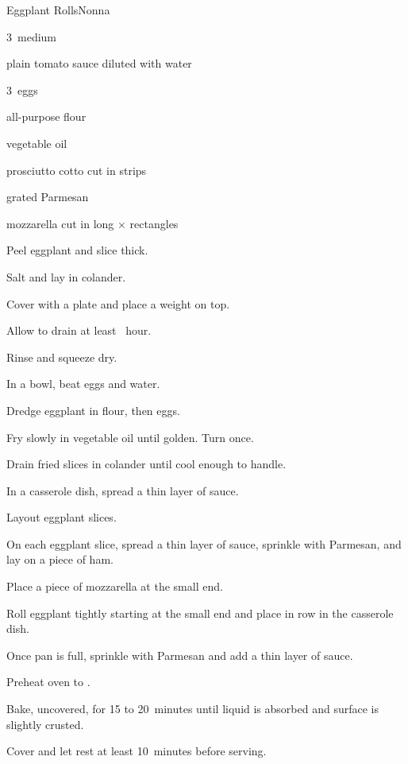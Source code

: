 \begin{recipe}{Eggplant Rolls}{Nonna}{}

\begin{ingredients}
\item 3~medium 
\item plain tomato sauce diluted with water
\item 3~eggs
\item all-purpose flour
\item vegetable oil
\item prosciutto cotto cut in  strips
\item grated Parmesan
\item mozzarella cut in long \inch{\quarter}$\times$\inch{\quarter} rectangles
\end{ingredients}

\begin{directions}
\item Peel eggplant and slice \inch{\quarter} thick.
\item Salt and lay in colander.
\item Cover with a plate and place a weight on top.
\item Allow to drain at least \half{}~hour.
\item Rinse and squeeze dry.
\item In a bowl, beat eggs and \C{\half} water.
\item Dredge eggplant in flour, then eggs.
\item Fry slowly in  vegetable oil until golden. Turn once.
\item Drain fried slices in colander until cool enough to handle.
\item In a casserole dish, spread a thin layer of sauce.
\item Layout eggplant slices.
\item On each eggplant slice, spread a thin layer of sauce, sprinkle with Parmesan, and lay on a piece of ham.
\item Place a piece of mozzarella at the small end.
\item Roll eggplant tightly starting at the small end and place in row in the casserole dish.
\item Once pan is full, sprinkle with Parmesan and add a thin layer of sauce.
\item Preheat oven to .
\item Bake, uncovered, for 15 to 20~minutes until liquid is absorbed and surface is slightly crusted.
\item Cover and let rest at least 10~minutes before serving.
\end{directions}

\end{recipe}
